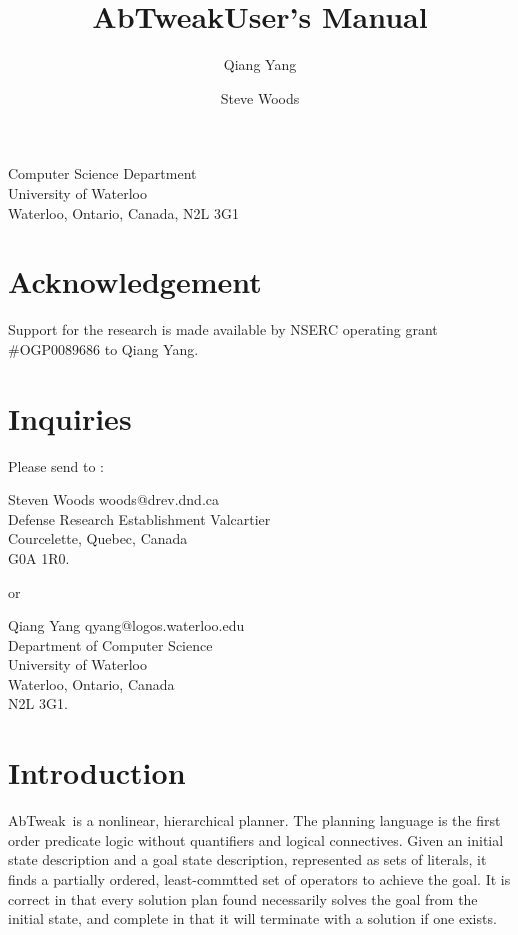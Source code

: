 
\newcommand{\tweak}{{\rm Tweak}}
\newcommand{\sipe}{{\rm Sipe}}
\newcommand{\noah}{{\rm Noah}}
\newcommand{\nonlin}{{\rm Nonlin}}
\newcommand{\abtweak}{{\rm AbTweak}}

\title{\abtweak User's Manual}

\author{Qiang Yang \and Steve Woods}

\date{}



\maketitle
\begin{center}
Computer Science Department \\ University of Waterloo \\ Waterloo,
Ontario, Canada, N2L 3G1\\
\end{center}

\section*{Acknowledgement}
Support for the research is made available by NSERC operating grant
\#OGP0089686 to Qiang Yang.

\section*{Inquiries}
Please send to :

Steven Woods woods@drev.dnd.ca\\
Defense Research Establishment Valcartier\\
Courcelette, Quebec, Canada\\
G0A 1R0.

or

Qiang Yang qyang@logos.waterloo.edu\\
Department of Computer Science\\
University of Waterloo\\
Waterloo, Ontario, Canada\\
N2L 3G1.

\newpage

\section{Introduction}
\abtweak\ is a nonlinear, hierarchical planner.  
The planning language is the first order predicate logic without
quantifiers and logical connectives.  Given an initial state
description and a goal state description, represented as sets of
literals, it finds a partially ordered, least-commtted set of
operators to achieve the goal.  It is correct in that every solution
plan found necessarily solves the goal from the initial state, and
complete in that it will terminate with a solution if one exists.

